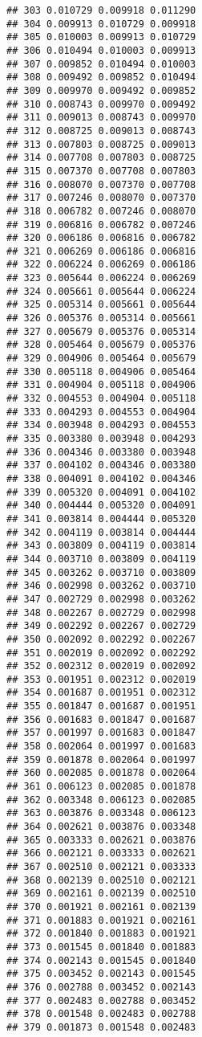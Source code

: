 \documentclass[]{article}
\begin{document}
\begin{verbatim}
## 303 0.010729 0.009918 0.011290
## 304 0.009913 0.010729 0.009918
## 305 0.010003 0.009913 0.010729
## 306 0.010494 0.010003 0.009913
## 307 0.009852 0.010494 0.010003
## 308 0.009492 0.009852 0.010494
## 309 0.009970 0.009492 0.009852
## 310 0.008743 0.009970 0.009492
## 311 0.009013 0.008743 0.009970
## 312 0.008725 0.009013 0.008743
## 313 0.007803 0.008725 0.009013
## 314 0.007708 0.007803 0.008725
## 315 0.007370 0.007708 0.007803
## 316 0.008070 0.007370 0.007708
## 317 0.007246 0.008070 0.007370
## 318 0.006782 0.007246 0.008070
## 319 0.006816 0.006782 0.007246
## 320 0.006186 0.006816 0.006782
## 321 0.006269 0.006186 0.006816
## 322 0.006224 0.006269 0.006186
## 323 0.005644 0.006224 0.006269
## 324 0.005661 0.005644 0.006224
## 325 0.005314 0.005661 0.005644
## 326 0.005376 0.005314 0.005661
## 327 0.005679 0.005376 0.005314
## 328 0.005464 0.005679 0.005376
## 329 0.004906 0.005464 0.005679
## 330 0.005118 0.004906 0.005464
## 331 0.004904 0.005118 0.004906
## 332 0.004553 0.004904 0.005118
## 333 0.004293 0.004553 0.004904
## 334 0.003948 0.004293 0.004553
## 335 0.003380 0.003948 0.004293
## 336 0.004346 0.003380 0.003948
## 337 0.004102 0.004346 0.003380
## 338 0.004091 0.004102 0.004346
## 339 0.005320 0.004091 0.004102
## 340 0.004444 0.005320 0.004091
## 341 0.003814 0.004444 0.005320
## 342 0.004119 0.003814 0.004444
## 343 0.003809 0.004119 0.003814
## 344 0.003710 0.003809 0.004119
## 345 0.003262 0.003710 0.003809
## 346 0.002998 0.003262 0.003710
## 347 0.002729 0.002998 0.003262
## 348 0.002267 0.002729 0.002998
## 349 0.002292 0.002267 0.002729
## 350 0.002092 0.002292 0.002267
## 351 0.002019 0.002092 0.002292
## 352 0.002312 0.002019 0.002092
## 353 0.001951 0.002312 0.002019
## 354 0.001687 0.001951 0.002312
## 355 0.001847 0.001687 0.001951
## 356 0.001683 0.001847 0.001687
## 357 0.001997 0.001683 0.001847
## 358 0.002064 0.001997 0.001683
## 359 0.001878 0.002064 0.001997
## 360 0.002085 0.001878 0.002064
## 361 0.006123 0.002085 0.001878
## 362 0.003348 0.006123 0.002085
## 363 0.003876 0.003348 0.006123
## 364 0.002621 0.003876 0.003348
## 365 0.003333 0.002621 0.003876
## 366 0.002121 0.003333 0.002621
## 367 0.002510 0.002121 0.003333
## 368 0.002139 0.002510 0.002121
## 369 0.002161 0.002139 0.002510
## 370 0.001921 0.002161 0.002139
## 371 0.001883 0.001921 0.002161
## 372 0.001840 0.001883 0.001921
## 373 0.001545 0.001840 0.001883
## 374 0.002143 0.001545 0.001840
## 375 0.003452 0.002143 0.001545
## 376 0.002788 0.003452 0.002143
## 377 0.002483 0.002788 0.003452
## 378 0.001548 0.002483 0.002788
## 379 0.001873 0.001548 0.002483

\end{verbatim}
\end{document}
